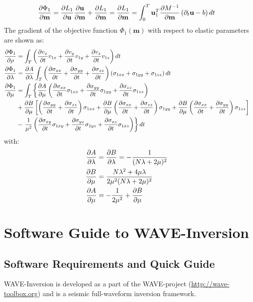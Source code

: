 \documentclass[pdftex,a4paper,parskip,listof=totoc,bibliography=totoc,onehalfspacing,12pt]{scrreprt}
\begin{document}
\begin{equation}
 \pdv{\Phi_1}{\mathbf{m}} = \pdv{L_1}{\mathbf{u}}\pdv{\mathbf{u}}{\mathbf{m}} + \pdv{L_1}{\mathbf{m}} =  \pdv{L_1}{\mathbf{m}} = \int_0^T \mathbf{u}_{1}^T \pdv{M^{-1}}{\mathbf{m}} \left( \partial_{t}\mathbf{u} -b \right) dt\\ 
\end{equation}
The gradient of the objective function $\Phi_1(\mathbf{m})$ with respect to elastic parameters are shown as:
\begin{align}
 \pdv{\Phi_1}{\rho}&=\int_T \left( \pdv{v_x}{t} v_{1x} + \pdv{v_y}{t} v_{1y} + \pdv{v_z}{t} v_{1z} \right) dt\\
 \pdv{\Phi_1}{\lambda}&=\pdv{A}{\lambda}\int_T  \left(\pdv{\sigma_{xx}}{t}+\pdv{\sigma_{yy}}{t}+\pdv{\sigma_{zz}}{t}\right) \left(\sigma_{1xx}+\sigma_{1yy}+\sigma_{1zz}\right)  dt\\
 \pdv{\Phi_1}{\mu}&=\int_T \left\{\pdv{A}{\mu}\left(\pdv{\sigma_{xx}}{t}\sigma_{1xx}+\pdv{\sigma_{yy}}{t}\sigma_{1yy}+\pdv{\sigma_{zz}}{t}\sigma_{1zz}\right)\right. \\
 &+ \pdv{B}{\mu} \left[\left(\pdv{\sigma_{yy}}{t}+\pdv{\sigma_{zz}}{t}\right)\sigma_{1xx}
 + \pdv{B}{\mu} \left(\pdv{\sigma_{xx}}{t}+\pdv{\sigma_{zz}}{t}\right)\sigma_{1yy}
  + \pdv{B}{\mu} \left(\pdv{\sigma_{xx}}{t}+\pdv{\sigma_{yy}}{t}\right)\sigma_{1zz}\right]\\
  &-\left.\frac{1}{\mu^2}\left(\pdv{\sigma_{xy}}{t}\sigma_{1xy}+\pdv{\sigma_{yz}}{t}\sigma_{1yz}+\pdv{\sigma_{xz}}{t}\sigma_{1xz}\right)\right\} dt
\end{align}
with:
\begin{align}
 \pdv{A}{\lambda}&=\pdv{B}{\lambda}=-\frac{1}{(N\lambda+2\mu)^2} \\
 \pdv{B}{\mu}&=\frac{N\lambda^2+4\mu\lambda}{2\mu^2(N\lambda+2\mu)^2} \\
 \pdv{A}{\mu}&=-\frac{1}{2\mu^2}+\pdv{B}{\mu}
\end{align}

\part{Software Guide to WAVE-Inversion}
\chapter{Software Requirements and Quick Guide}

WAVE-Inversion is developed as a part of the WAVE-project (\url{http://wave-toolbox.org}) and is a seismic full-waveform inversion framework. 
\end{document}
